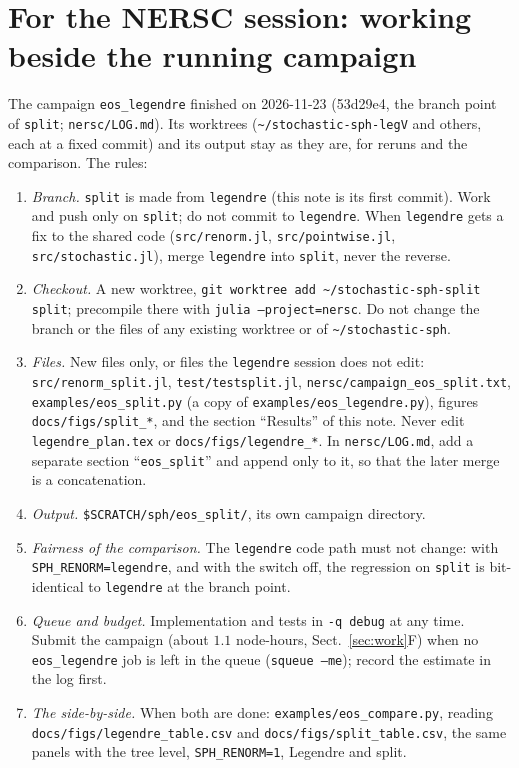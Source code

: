 \documentclass[11pt,aps,preprint,nofootinbib,superscriptaddress,tightenlines]{revtex4-2}
\def\Sect#1{Sect.~\ref{#1}}
\begin{document}
\section{For the NERSC session: working beside the running campaign}
\label{sec:nersc}

The campaign \texttt{eos\_legendre} finished on 2026-11-23 (53d29e4, the branch point of \texttt{split}; \nolinkurl{nersc/LOG.md}).  Its worktrees
(\texttt{\textasciitilde/stochastic-sph-legV} and others, each at a fixed commit) and its output stay as they are, for reruns and the comparison.  The rules:
\begin{enumerate}
\item \emph{Branch.}  \texttt{split} is made from \texttt{legendre} (this note is its first commit).  Work and push only on \texttt{split}; do not commit to
  \texttt{legendre}.  When \texttt{legendre} gets a fix to the shared code (\nolinkurl{src/renorm.jl}, \nolinkurl{src/pointwise.jl}, \nolinkurl{src/stochastic.jl}),
  merge \texttt{legendre} into \texttt{split}, never the reverse.
\item \emph{Checkout.}  A new worktree, \texttt{git worktree add \textasciitilde/stochastic-sph-split split}; precompile there with \texttt{julia --project=nersc}.
  Do not change the branch or the files of any existing worktree or of \texttt{\textasciitilde/stochastic-sph}.
\item \emph{Files.}  New files only, or files the \texttt{legendre} session does not edit: \nolinkurl{src/renorm_split.jl}, \nolinkurl{test/testsplit.jl},
  \nolinkurl{nersc/campaign_eos_split.txt}, \nolinkurl{examples/eos_split.py} (a copy of \nolinkurl{examples/eos_legendre.py}), figures \nolinkurl{docs/figs/split_*},
  and the section ``Results'' of this note.  Never edit \nolinkurl{legendre_plan.tex} or \nolinkurl{docs/figs/legendre_*}.  In \nolinkurl{nersc/LOG.md}, add a
  separate section ``\texttt{eos\_split}'' and append only to it, so that the later merge is a concatenation.
\item \emph{Output.}  \texttt{\$SCRATCH/sph/eos\_split/}, its own campaign directory.
\item \emph{Fairness of the comparison.}  The \texttt{legendre} code path must not change: with \texttt{SPH\_RENORM=legendre}, and with the switch off, the regression
  on \texttt{split} is bit-identical to \texttt{legendre} at the branch point.
\item \emph{Queue and budget.}  Implementation and tests in \texttt{-q debug} at any time.  Submit the campaign (about $1.1$ node-hours, \Sect{sec:work}F) when no
  \texttt{eos\_legendre} job is left in the queue (\texttt{squeue --me}); record the estimate in the log first.
\item \emph{The side-by-side.}  When both are done: \nolinkurl{examples/eos_compare.py}, reading \nolinkurl{docs/figs/legendre_table.csv} and
  \nolinkurl{docs/figs/split_table.csv}, the same panels with the tree level, \texttt{SPH\_RENORM=1}, Legendre and split.
\end{enumerate}
\end{document}
